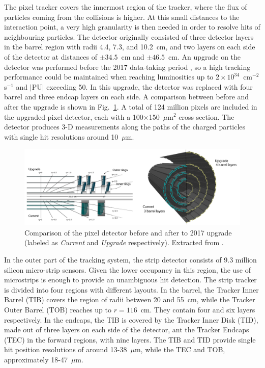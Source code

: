 \documentclass[../main.tex]{subfiles}
\begin{document}
The pixel tracker covers the innermost region of the tracker, where the flux of particles coming from the collisions is higher. At this small distances to the interaction point, a very high granularity is then needed in order to resolve hits of neighbouring particles. The detector originally consisted of three detector layers in the barrel region with radii 4.4, 7.3, and 10.2~cm, and two layers on each side of the detector at distances of $\pm34.5$~cm and $\pm46.5$~cm. An upgrade on the detector was performed before the 2017 data-taking period \cite{intro:exp:tracker_upgrade}, so a high tracking performance could be maintained when reaching luminosities up to $2\times10^{34}$~cm${}^{-2}$s${}^{-1}$ and $|\text{PU}|$ exceeding 50. In this upgrade, the detector was replaced with four barrel and three endcap layers on each side. A comparison between before and after the upgrade is shown in Fig.~\ref{intro:fig:tracker_upgrade}. A total of 124 million pixels are included in the upgraded pixel detector, each with a 100$\times$150~$\mu$m${}^2$ cross section. The detector produces 3-D measurements along the paths of the charged particles with single hit resolutions around 10~$\mu$m.

\begin{figure}[h!]
\begin{center}
\includegraphics[width=\textwidth]{Images/tracker_upgrade}
\end{center}
\caption{Comparison of the pixel detector before and after to 2017 upgrade (labeled as \textit{Current} and \textit{Upgrade} respectively). Extracted from \cite{intro:exp:tracker_upgrade}.}
\label{intro:fig:tracker_upgrade}
\end{figure}

In the outer part of the tracking system, the strip detector consists of 9.3 million silicon micro-strip sensors. Given the lower occupancy in this region, the use of microstrips is enough to provide an unambiguous hit detection. The strip tracker is divided into four regions with different layouts. In the barrel, the Tracker Inner Barrel (TIB) covers the region of radii between 20 and 55~cm, while the Tracker Outer Barrel (TOB) reaches up to $r=116$~cm. They contain four and six layers respectively. In the endcaps, the TIB is covered by the Tracker Inner Disk (TID), made out of three layers on each side of the detector, ant the Tracker Endcaps (TEC) in the forward regions, with nine layers. The TIB and TID provide single hit position resolutions of around 13-38~$\mu$m, while the TEC and TOB, approximately 18-47~$\mu$m.
\end{document}
